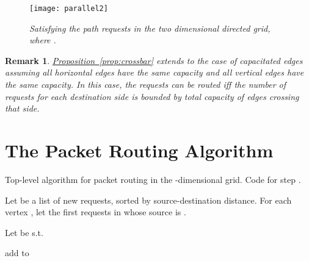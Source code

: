 \documentclass[11pt]{article}
\newtheorem{rem}[theorem]{Remark}
\newcommand{\namedref}[2]{\hyperref[#2]{#1~\ref*{#2}}}
\newcommand{\propref}[1]{\namedref{Proposition}{#1}}
\newenvironment{proof sketch}[1]{\noindent {\emph{Proof sketch of #1:}}}{\hfill \qed}
\begin{document}
\begin{figure}[t]
      \centering
        \texttt{[image: parallel2]}
        \caption{\em Satisfying the path requests in the  two
          dimensional directed grid, where . }
      \label{fig:crossbar2}
    \end{figure}

\begin{rem}
  \propref{prop:crossbar} extends to the case of capacitated edges
assuming all horizontal edges have the same capacity and all
  vertical edges have the same capacity.
In this case, the requests can be routed iff
  the number of requests for each destination side is bounded by
  total capacity of edges crossing that side.
\end{rem}
\section{The Packet Routing Algorithm}
\label{sec:alg}
\begin{algorithm}[t]
\ifnum{}
\small
\fi
\caption{Top-level algorithm for packet routing in the -dimensional
  grid. Code for step .}
\label{alg:outline}
\begin{algorithmic}[1]
\State Let  be a list of new requests, sorted by
source-destination distance. \label{l0}
\State For each vertex , let  the first  requests in 
whose source is .
\label{line:filter}
  \label{l00}

\If {}{ } \label{l1}
\Else
\State Let  be s.t.\  \label{l2}
\State \label{item:IPP} 
\label{l5}
\State \label{item:init-route}  \label{l6}


\State add  to 
\State {}

\EndIf
\EndIf
\EndFor
\end{algorithmic}
\end{algorithm}
\end{document}
